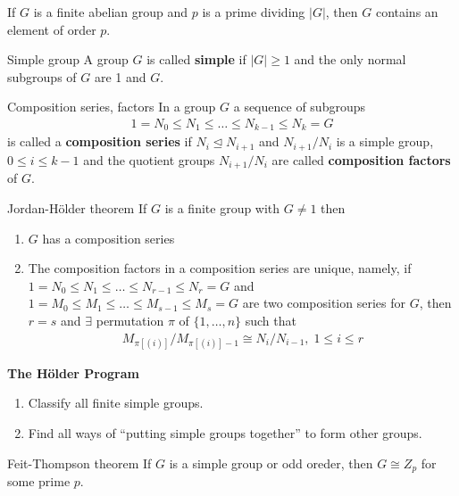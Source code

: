 \documentclass[titlepage, 12pt]{article}
\begin{document}
\begin{proposition}{}{}
    If $G$ is a finite abelian group and $p$ is a prime dividing $|G|$, then $G$
    contains an element of order $p$.
\end{proposition}
\begin{definition}{Simple group}{}
    A group $G$ is called \textbf{simple} if $|G|\ge 1$ and the only normal
    subgroups of $G$ are 1 and $G$.
\end{definition}
\begin{definition}{Composition series, factors}{}
    In a group $G$ a sequence of subgroups
    \begin{gather*}
        1 = N_0\le N_1\le\dots\le N_{k-1}\le N_k = G
    \end{gather*}
    is called a \textbf{composition series} if $N_i\trianglelefteq N_{i+1}$ and
    $N_{i+1}/N_i$ is a simple group, $0\le i\le k-1$ and the quotient groups
    $N_{i+1}/N_i$ are called \textbf{composition factors} of $G$.
\end{definition}
\begin{theorem}{Jordan-H\"older theorem}{}
    If $G$ is a finite group with $G\neq 1$ then
    \begin{enumerate}
        \item $G$ has a composition series
        \item The composition factors in a composition series are unique,
            namely, if $1 = N_0\le N_1\le\dots\le N_{r-1}\le N_r = G$ and $1 =
            M_0\le M_1\le\dots\le M_{s-1}\le M_s = G$ are two composition series
            for $G$, then $r = s$ and $\exists$ permutation $\pi$ of
            $\{1,\dots,n\}$ such that
            \begin{gather*}
                M_{\pi[(i)]}/M_{\pi[(i)] - 1}\cong N_i/N_{i - 1},\; 1\le i\le r
            \end{gather*}
    \end{enumerate}
\end{theorem}
\begin{center}
    \large{\textbf{The H\"older Program}}
    \begin{enumerate}
        \item Classify all finite simple groups.
        \item Find all ways of ``putting simple groups together'' to form other
            groups.
    \end{enumerate}
\end{center}
\begin{theorem}{Feit-Thompson theorem}{}
    If $G$ is a simple group or odd oreder, then $G\cong Z_p$ for some prime
    $p$.
\end{theorem}
\end{document}

